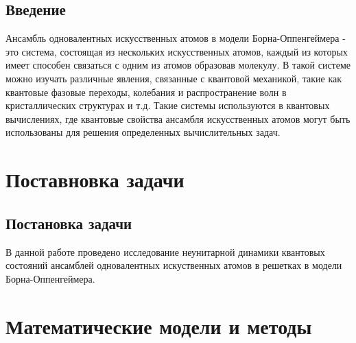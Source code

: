 \documentclass[12pt, a4paper]{article}
\begin{document}
\subsection{Введение}
\qquad Ансамбль одновалентных искусственных атомов в модели Борна-Оппенгеймера - это система, состоящая из нескольких искусственных атомов, каждый из которых имеет способен связаться с одним из атомов образовав молекулу.
\newline \null 
\qquad В такой системе можно изучать различные явления, связанные с квантовой механикой, такие как квантовые фазовые переходы, колебания и распространение волн в кристаллических структурах и т.д. 
Такие системы используются в квантовых вычислениях, где квантовые свойства ансамбля искусственных атомов могут быть использованы для решения определенных вычислительных задач.
\section{Поставновка задачи}
\subsection{Постановка задачи}
\qquad В данной работе проведено исследование неунитарной динамики квантовых состояний ансамблей одновалентных искуственных атомов в решетках в модели Борна-Оппенгеймера.
\section{Математические модели и методы}
\end{document}
